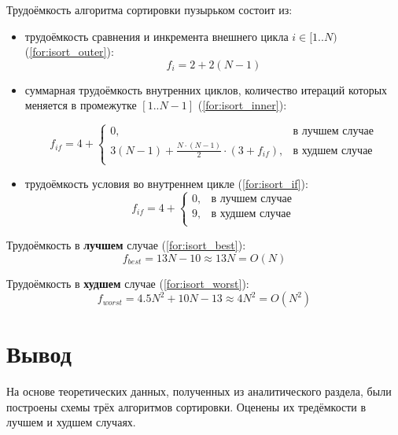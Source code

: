 \documentclass[12pt]{report}
\begin{document}
Трудоёмкость алгоритма сортировки пузырьком состоит из:
\begin{itemize}
	\item трудоёмкость сравнения и инкремента внешнего цикла $i \in [1..N)$ (\ref{for:isort_outer}):
	\begin{equation}
		\label{for:isort_outer}
		f_{i} = 2 + 2(N - 1)
	\end{equation}
	\item суммарная трудоёмкость внутренних циклов, количество итераций которых меняется в промежутке $[1..N-1]$ (\ref{for:isort_inner}):
	
	\begin{equation}
		\label{for:isort_inner}
		f_{if} = 4 + \begin{cases}
			0, & \text{в лучшем случае}\\
			3(N - 1) + \frac{N \cdot (N - 1)}{2} \cdot (3 + f_{if}), & \text{в худшем случае}\\
		\end{cases}
	\end{equation}
	
	\item трудоёмкость условия во внутреннем цикле (\ref{for:isort_if}):
	\begin{equation}
		\label{for:isort_if}
		f_{if} = 4 + \begin{cases}
			0, & \text{в лучшем случае}\\
			9, & \text{в худшем случае}\\
		\end{cases}
	\end{equation}
\end{itemize}

Трудоёмкость в \textbf{лучшем} случае (\ref{for:isort_best}):
\begin{equation}
	\label{for:isort_best}
	f_{best} = 13N - 10 \approx 13N = O(N)
\end{equation}

Трудоёмкость в \textbf{худшем} случае (\ref{for:isort_worst}):
\begin{equation}
	\label{for:isort_worst}
	f_{worst} = 4.5N^2 + 10N - 13 \approx 4N^2 = O(N^{2})
\end{equation}

\section{Вывод}
	На основе теоретических данных, полученных из аналитического раздела, были построены схемы трёх алгоритмов сортировки. Оценены их тредёмкости в лучшем и худшем случаях.
\end{document}
